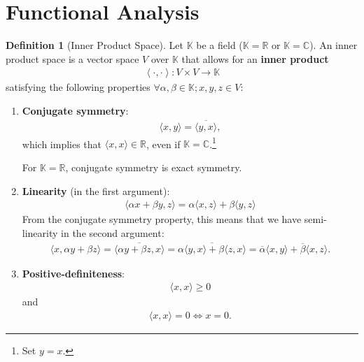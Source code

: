 \documentclass[12pt, a4paper]{article}
\numberwithin{equation}{section}
\theoremstyle{definition}
\theoremstyle{definition}
\newtheorem{defn}[thm]{Definition} %
\begin{document}
	\section{Functional Analysis}
	\begin{defn}[Inner Product Space]
		Let $\mathbb K$ be a field ($\mathbb K = \mathbb R$ or $\mathbb K = \mathbb C$). An inner product space is a vector space $V$ over $\mathbb K$ that allows for an \textbf{inner product} 
		\begin{align}
			\left\langle \bm{\cdot}, \bm{\cdot}\right\rangle: V\times V\rightarrow \mathbb K
		\end{align}
		satisfying the following properties $\forall \alpha, \beta\in \mathbb K; x, y, z\in V$:
		\begin{enumerate}
			\item \textbf{Conjugate symmetry}:
			\begin{align}
				\langle x, y\rangle = \overline{\langle y, x\rangle},
			\end{align}
			which implies that $\langle x, x\rangle\in \mathbb R$, even if $\mathbb K = \mathbb C$.\footnote{Set $y = x$.} 
			
			For $\mathbb K = \mathbb R$, conjugate symmetry is exact symmetry.
			
			\item \textbf{Linearity} (in the first argument): 
			\begin{align}
				\langle \alpha x + \beta y, z\rangle = \alpha\langle x, z\rangle + \beta\langle y, z\rangle
			\end{align}
			From the conjugate symmetry property, this means that we have semi-linearity in the second argument:
			\begin{align}
				\langle x, \alpha y + \beta z\rangle = \overline{\langle \alpha y + \beta z, x \rangle} = \overline{\alpha\langle y, x \rangle + \beta\langle z, x \rangle} = \overline{\alpha}\langle x, y\rangle + \overline{\beta}\langle x, z\rangle.
			\end{align}
		
			\item \textbf{Positive-definiteness}:
			\begin{align}
				\langle x, x\rangle \geq 0
			\end{align}
			and 
			\begin{align}
				\langle x, x\rangle = 0 \Leftrightarrow x = 0.
			\end{align}
		\end{enumerate}
	\end{defn}
\end{document}
